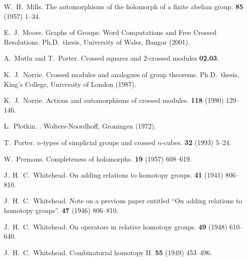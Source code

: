\begin{thebibliography}{notesdev}
W.~H.~Mills.
\newblock The automorphisms of the holomorph of a finite abelian group.
 {\bf 85} (1957) 1--34.

E.~J.~Moore.
\newblock Graphs of Groups: Word Computations and Free Crossed Resolutions.
\newblock Ph.{D}.~thesis, University of Wales, Bangor (2001).

A.~Mutlu and T.~Porter.
\newblock Crossed squares and $2$-crossed modules {\bf 02.03}.

K.~J.~Norrie.
\newblock Crossed modules and analogues of group theorems.
\newblock Ph.{D}.~thesis, King's College, University of London (1987).

K.~J.~Norrie.
\newblock Actions and automorphisms of crossed modules.
 {\bf 118} (1990) 129--146.

L.~Plotkin.
.
\newblock Wolters-Noordhoff, Groningen (1972).

T.~Porter.
\newblock $n$-types of simplicial groups and crossed $n$-cubes.
 {\bf 32} (1993) 5--24.

W.~Premans.
\newblock Completeness of holomorphs.
 {\bf 19} (1957) 608--619.

J.~H.~C.~Whitehead.
\newblock On adding relations to homotopy groups.
 {\bf 41} (1941) 806--810.

J.~H.~C.~Whitehead.
\newblock Note on a previous paper entitled ``On adding relations to homotopy
  groups''.
 {\bf 47} (1946) 806--810.

J.~H.~C.~Whitehead.
\newblock On operators in relative homotopy groups.
 {\bf 49} (1948) 610--640.

J.~H.~C.~Whitehead.
\newblock Combinatorial homotopy {I}{I}.
 {\bf 55} (1949) 453--496.

\end{thebibliography}
